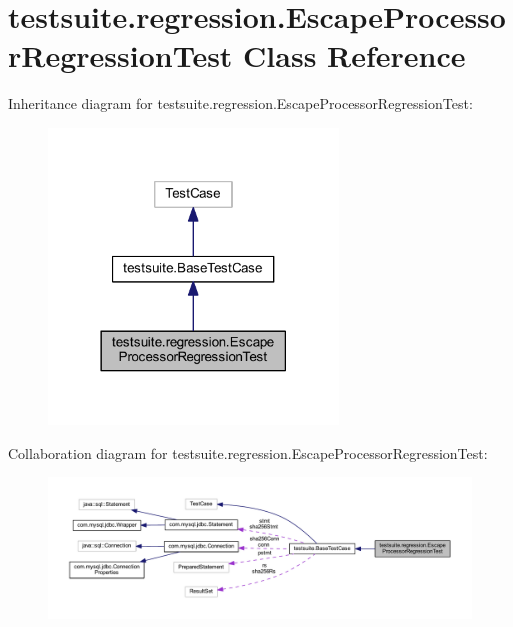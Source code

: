 \hypertarget{classtestsuite_1_1regression_1_1_escape_processor_regression_test}{}\section{testsuite.\+regression.\+Escape\+Processor\+Regression\+Test Class Reference}
\label{classtestsuite_1_1regression_1_1_escape_processor_regression_test}


Inheritance diagram for testsuite.\+regression.\+Escape\+Processor\+Regression\+Test\+:
\nopagebreak
\begin{figure}[H]
\begin{center}
\leavevmode
\includegraphics[width=218pt]{classtestsuite_1_1regression_1_1_escape_processor_regression_test__inherit__graph}
\end{center}
\end{figure}


Collaboration diagram for testsuite.\+regression.\+Escape\+Processor\+Regression\+Test\+:
\nopagebreak
\begin{figure}[H]
\begin{center}
\leavevmode
\includegraphics[width=350pt]{classtestsuite_1_1regression_1_1_escape_processor_regression_test__coll__graph}
\end{center}
\end{figure}
